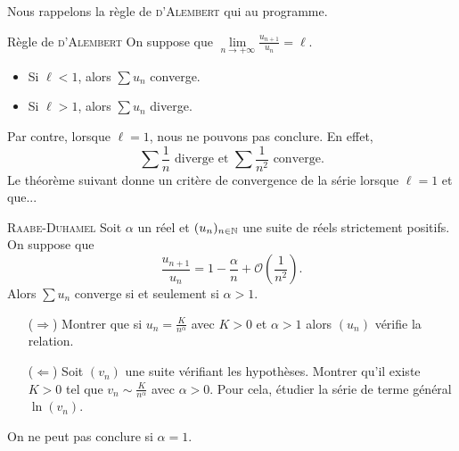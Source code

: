 Nous rappelons la règle de \textsc{d'Alembert} qui au programme.

\begin{theo}{Règle de \textsc{d'Alembert}}
    On suppose que $\lim\limits_{n \to + \infty} \frac{u_{n+1}}{u_n} = \ell$.
    \begin{itemize}
        \item Si $\ell < 1$, alors $\sum u_n$ converge.
        \item Si $\ell > 1$, alors $\sum u_n$ diverge.
    \end{itemize}
\end{theo}
Par contre, lorsque $\ell = 1$, nous ne pouvons pas conclure. En effet, 
$$\sum \frac{1}{n} \text{ diverge et } \sum \frac{1}{n^2} \text{ converge}.$$
Le théorème suivant donne un critère de convergence de la série lorsque $\ell = 1$ et que...
\begin{theo}{\textsc{Raabe}-\textsc{Duhamel}}
    Soit $\alpha$ un réel et $(u_n)_{n \in \mathbb{N}}$ une suite de réels strictement positifs. On suppose que
    $$\displaystyle \frac{u_{n+1}}{u_n} = 1 - \frac{\alpha}{n} + \mathcal{O} \left( \frac{1}{n^2} \right).$$ Alors $\sum u_n$ converge si et seulement si $\alpha > 1$. 
\end{theo}
\begin{preuve}
    \begin{enumerate}
        \item[($\Rightarrow$)] Montrer que si $u_n=\frac{K}{n^{\alpha}}$ avec $K>0$ et $\alpha > 1$ alors $(u_n)$ vérifie la relation.
        \item[($\Leftarrow$)] Soit $(v_n)$ une suite vérifiant les hypothèses. Montrer qu'il existe $K>0$ tel que $v_n \sim \frac{K}{n^{\alpha}}$ avec $\alpha > 0$. Pour cela, étudier la série de terme général $\ln (v_n)$.
    \end{enumerate}
\end{preuve}

On ne peut pas conclure si $\alpha=1$.